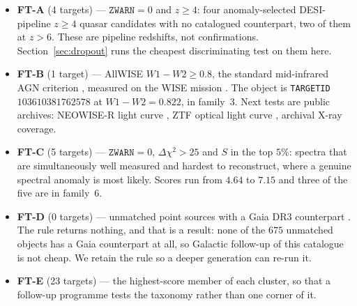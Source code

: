 \documentclass[aps,prd,twocolumn,superscriptaddress,nofootinbib,longbibliography,floatfix]{revtex4-2}
\newcommand{\ZWARN}{\texttt{ZWARN}}
\newcommand{\TARGETID}{\texttt{TARGETID}}
\begin{document}
\begin{itemize}[leftmargin=1.2em,itemsep=2pt]
  \item \textbf{FT-A} (4 targets) --- $\ZWARN = 0$ and $z \ge 4$: four
        anomaly-selected DESI-pipeline $z \ge 4$ quasar candidates with no
        catalogued counterpart, two of them at $z > 6$. These are pipeline
        redshifts, not confirmations. Section~\ref{sec:dropout} runs the
        cheapest discriminating test on them here.
  \item \textbf{FT-B} (1 target) --- AllWISE \cite{AllWISE} $W1-W2 \ge 0.8$,
        the standard mid-infrared AGN criterion \cite{Stern2012}, measured on
        the WISE mission \cite{WISE}. The object is
        \TARGETID~$103610381762578$ at $W1-W2 = 0.822$, in family~3. Next
        tests are public archives: NEOWISE-R light curve \cite{NEOWISE}, ZTF
        optical light curve \cite{ZTF}, archival X-ray coverage.
  \item \textbf{FT-C} (5 targets) --- $\ZWARN = 0$, $\Delta\chi^2 > 25$ and
        $S$ in the top $5\%$: spectra that are simultaneously well measured
        and hardest to reconstruct, where a genuine spectral anomaly is most
        likely. Scores run from $4.64$ to $7.15$ and three of the five are in
        family~6.
  \item \textbf{FT-D} (0 targets) --- unmatched point sources with a Gaia DR3
        counterpart \cite{GaiaDR3}. The rule returns nothing, and that is a
        result: none of the $675$ unmatched objects has a Gaia counterpart at
        all, so Galactic follow-up of this catalogue is not cheap. We retain
        the rule so a deeper generation can re-run it.
  \item \textbf{FT-E} (23 targets) --- the highest-score member of each
        cluster, so that a follow-up programme tests the taxonomy rather than
        one corner of it.
\end{itemize}

\begin{table}[t]
\caption{Named follow-up targets. $S$ is the anomaly score. Redshifts are
DESI pipeline values and are printed only where $\ZWARN = 0$; a dash marks an
object whose fit carries $\ZWARN = 4$ (\texttt{SMALL\_DELTA\_CHI2}), for which
the pipeline redshift is not a measurement. The FT-E tier spans the taxonomy
by construction and therefore includes such objects.}
\label{tab:followup}

\end{table}
\end{document}
